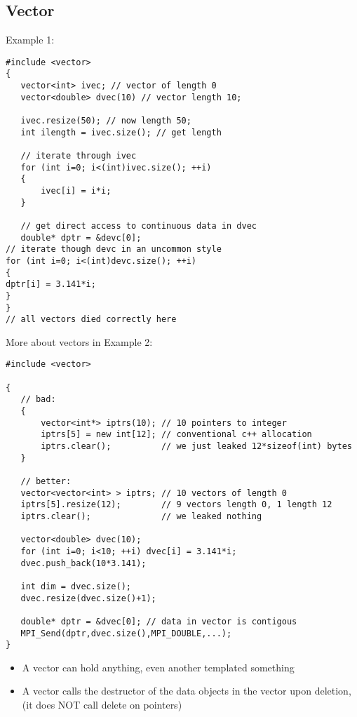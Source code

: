 \subsection{Vector}
Example 1:\\
\begin{boxedminipage}{\linewidth}
\begin{verbatim}
#include <vector>
{
   vector<int> ivec; // vector of length 0
   vector<double> dvec(10) // vector length 10;

   ivec.resize(50); // now length 50;
   int ilength = ivec.size(); // get length

   // iterate through ivec
   for (int i=0; i<(int)ivec.size(); ++i)
   {
       ivec[i] = i*i;
   }

   // get direct access to continuous data in dvec
   double* dptr = &devc[0];
// iterate though devc in an uncommon style
for (int i=0; i<(int)devc.size(); ++i)
{
dptr[i] = 3.141*i;
}
}
// all vectors died correctly here
\end{verbatim}
\end{boxedminipage}
More about vectors in Example 2:\\
\begin{boxedminipage}{\linewidth}
\begin{verbatim}
#include <vector>

{
   // bad:
   {
       vector<int*> iptrs(10); // 10 pointers to integer
       iptrs[5] = new int[12]; // conventional c++ allocation
       iptrs.clear();          // we just leaked 12*sizeof(int) bytes
   }

   // better:
   vector<vector<int> > iptrs; // 10 vectors of length 0
   iptrs[5].resize(12);        // 9 vectors length 0, 1 length 12
   iptrs.clear();              // we leaked nothing

   vector<double> dvec(10);
   for (int i=0; i<10; ++i) dvec[i] = 3.141*i;
   dvec.push_back(10*3.141);

   int dim = dvec.size();
   dvec.resize(dvec.size()+1);

   double* dptr = &dvec[0]; // data in vector is contigous
   MPI_Send(dptr,dvec.size(),MPI_DOUBLE,...);
}
\end{verbatim}
\end{boxedminipage}
\begin{itemize}
\item A vector can hold anything, even another templated something
\item A vector calls the destructor of the data objects in the vector upon deletion,
(it does NOT call delete on pointers)
\end{itemize}

